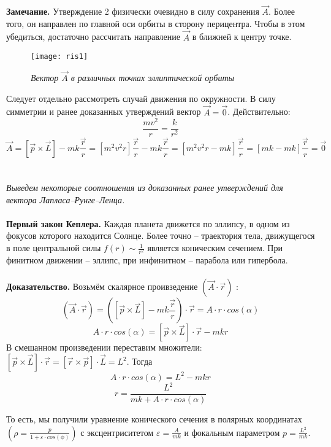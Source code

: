 \documentclass[a4paper,12pt]{article}
\begin{document}
\textbf{Замечание.} Утверждение 2 физически очевидно в силу сохранения $\vec{A}$. Более того, он направлен по главной оси орбиты в сторону перицентра. Чтобы в этом убедиться, достаточно рассчитать направление $\vec{A}$ в ближней к центру точке.
\begin{figure}[h]
    \centering
    \texttt{[image: ris1]}
    \caption{\textit{Вектор $\vec{A}$ в различных точках эллиптической орбиты}}
\end{figure}
\newpage
Следует отдельно рассмотреть случай движения по окружности. В силу симметрии и ранее доказанных утверждений вектор $\vec{A} = \vec{0}$. Действительно: 
\[\frac{m v^2}{r} = \frac{k}{r^2}\]
\[\vec{A} = \left[\vec{p} \times \vec{L} \right] - mk\frac{\vec{r}}{r} = [m^2v^2r]\frac{\vec{r}}{r} - mk\frac{\vec{r}}{r} = [m^2v^2r - mk]\frac{\vec{r}}{r} = [mk - mk]\frac{\vec{r}}{r} = \vec{0}\]	
\\\\
\textit{Выведем некоторые соотношения из доказанных ранее утверждений для вектора Лапласа--Рунге--Ленца.}
\\\\
\textbf{Первый закон Кеплера.}
Каждая планета движется по эллипсу, в одном из фокусов которого находится Солнце. Более точно -- траектория тела, движущегося в поле центральной силы $f(r) \sim \frac{1}{r^2}$ является коническим сечением. При финитном движении -- эллипс, при инфинитном -- парабола или гипербола.
\\\\
\textbf{Доказательство.}
Возьмём скалярное проивзедение $(\vec{A}\cdot\vec{r})$ :
\[(\vec{A}\cdot\vec{r}) = \left(\left[\vec{p}\times\vec{L} \right] - mk\frac{\vec{r}}{r}\right)\cdot\vec{r} = A\cdot r\cdot cos(\alpha) \]
\[A\cdot r\cdot cos(\alpha) = \left[\vec{p}\times\vec{L}\right]\cdot\vec{r} - mkr\]
В смешанном произведении переставим множители: $\left[\vec{p}\times\vec{L}\right]\cdot\vec{r} = \left[\vec{r}\times\vec{p}\right]\cdot\vec{L} = L^2$. Тогда
\[A\cdot r\cdot cos(\alpha) = L^2 - mkr\]
\[r = \frac{L^2}{mk + A\cdot r\cdot cos(\alpha)} \]


То есть, мы получили уравнение конического сечения в полярных координатах
$(\rho = \frac{p}{1+\varepsilon\cdot cos(\phi)})$ с эксцентриситетом $\varepsilon = \frac{A}{mk}$ и фокальным параметром $p = \frac{L^2}{mk}$.
\end{document}
